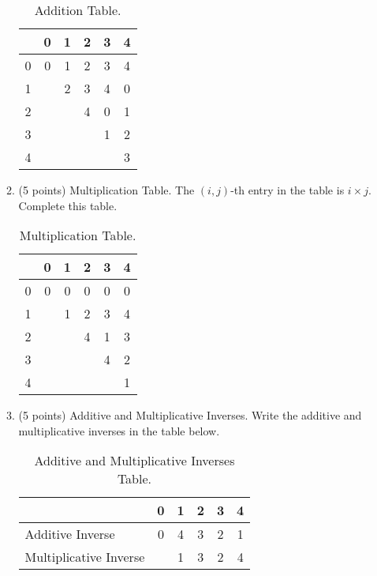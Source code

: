 \documentclass[11pt]{article}
\begin{document}
\begin{enumerate}
\begin{enumerate}
    \begin{table}[H]
    \begin{center}
    \begin{tabular}{|c|c|c|c|c|c|}\hline
     & 0 & 1 & 2 & 3 & 4 \\\hline 
    0 & 0 & 1 & 2 & 3 & 4 \\\hline
    1 & \cellcolor{black} & 2 & 3 & 4 & 0 \\\hline
    2 & \cellcolor{black} & \cellcolor{black} & 4 & 0 & 1 \\\hline
    3 & \cellcolor{black} & \cellcolor{black} & \cellcolor{black} & 1 & 2 \\\hline
    4 & \cellcolor{black} & \cellcolor{black} & \cellcolor{black} & \cellcolor{black} & 3 \\\hline
    \end{tabular}
    \end{center}
    \caption{Addition Table.}
    \end{table}
  
  \item (5 points) Multiplication Table. 
    The $(i,j)$-th entry in the table is $i\times j$. 
    Complete this table. 
  
    \begin{table}[H]
    \begin{center}
    \begin{tabular}{|c|c|c|c|c|c|}\hline
     & 0 & 1 & 2 & 3 & 4 \\\hline 
    0 & 0 & 0 & 0 & 0 & 0 \\\hline
    1 & \cellcolor{black} & 1 & 2 & 3 & 4 \\\hline
    2 & \cellcolor{black} & \cellcolor{black} & 4 & 1 & 3 \\\hline
    3 & \cellcolor{black} & \cellcolor{black} & \cellcolor{black} & 4 & 2 \\\hline
    4 & \cellcolor{black} & \cellcolor{black} & \cellcolor{black} & \cellcolor{black} & 1 \\\hline
    \end{tabular}
    \end{center}
    \caption{Multiplication Table.}
    \end{table}
    
  \item (5 points) Additive and Multiplicative Inverses. 
    Write the additive and multiplicative inverses in the table below. 
  
    \begin{table}[H]
    \begin{center}
    \begin{tabular}{|l|c|c|c|c|c|}\hline
    & 0 & 1 & 2 & 3 & 4 \\\hline 
    Additive Inverse & 0 & 4 & 3 & 2 & 1 \\\hline
    Multiplicative Inverse & \cellcolor{black} & 1 & 3 & 2 & 4 \\\hline 
    \end{tabular}
    \end{center}
    \caption{Additive and Multiplicative Inverses Table.}
    \end{table} 
  

\end{enumerate}
\end{enumerate}
\end{document}
